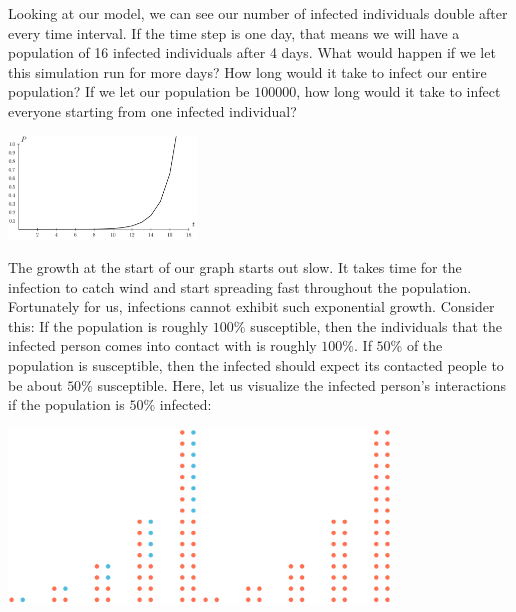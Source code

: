 \documentclass{amsart}
\theoremstyle{definition}
\numberwithin{equation}{section}
\begin{document}
\begin{sansmath}
Looking at our model, we can see our number of infected individuals double after every time interval. If the time step is one day, that means we will have a population of 16 infected individuals after 4 days. What would happen if we let this simulation run for more days? How long would it take to infect our entire population? If we let our population be $100000$, how long would it take to infect everyone starting from one infected individual?

\begin{center}
  \includegraphics[width=5cm]{ExponentialGrowth}
\end{center}

The growth at the start of our graph starts out slow. It takes time for the infection to catch wind and start spreading fast throughout the population. Fortunately for us, infections cannot exhibit such exponential growth. Consider this: If the population is roughly $100\%$ susceptible, then the individuals that the infected person comes into contact with is roughly $100\%$. If $50\%$ of the population is susceptible, then the infected should expect its contacted people to be about $50\%$ susceptible. Here, let us visualize the infected person's interactions if the population is $50\%$ infected:

\begin{center}
  \includegraphics[width=5cm]{DotsLogisticPre}
  \quad
  \includegraphics[width=5cm]{DotsLogisticPost}
\end{center}


\end{sansmath}
\end{document}
